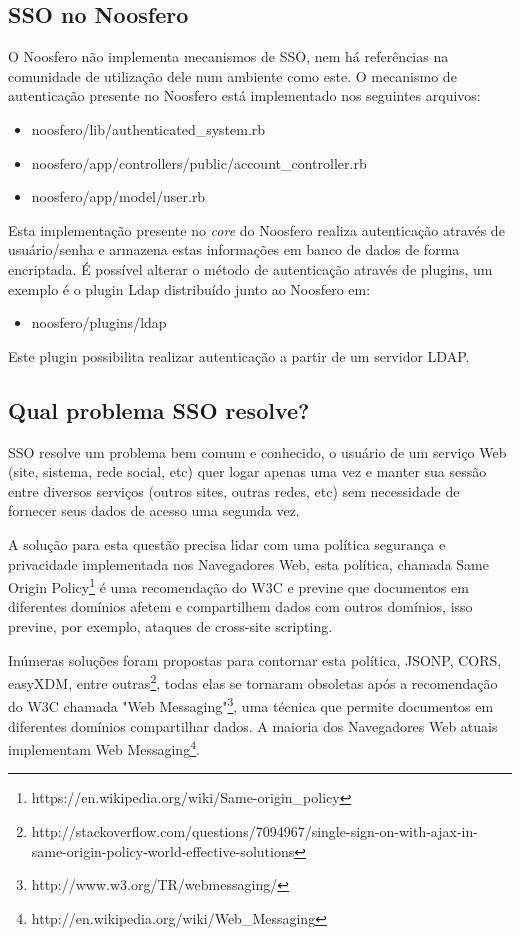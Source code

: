 \documentclass[11pt]{article}
\begin{document}
\subsection{SSO no Noosfero}

O Noosfero não implementa mecanismos de SSO, nem há referências na comunidade
de utilização dele num ambiente como este. O mecanismo de autenticação presente
no Noosfero está implementado nos seguintes arquivos:

\begin{itemize}
  \item noosfero/lib/authenticated\_system.rb
  \item noosfero/app/controllers/public/account\_controller.rb
  \item noosfero/app/model/user.rb
\end{itemize}

Esta implementação presente no {\it core} do Noosfero realiza autenticação
através de usuário/senha e armazena estas informações em banco de dados de
forma encriptada. É possível alterar o método de autenticação através de
plugins, um exemplo é o plugin Ldap distribuído junto ao Noosfero em:

\begin{itemize}
  \item noosfero/plugins/ldap
\end{itemize}

Este plugin possibilita realizar autenticação a partir de um servidor LDAP.

\subsection{Qual problema SSO resolve?}

SSO resolve um problema bem comum e conhecido, o usuário de um serviço Web
(site, sistema, rede social, etc) quer logar apenas uma vez e manter sua
sessão entre diversos serviços (outros sites, outras redes, etc) sem
necessidade de fornecer seus dados de acesso uma segunda vez.

A solução para esta questão precisa lidar com uma política segurança e
privacidade implementada nos Navegadores Web, esta política, chamada Same
Origin Policy\footnote{https://en.wikipedia.org/wiki/Same-origin\_policy} é
uma recomendação do W3C e previne que documentos em diferentes domínios afetem
e compartilhem dados com outros domínios, isso previne, por exemplo, ataques de
cross-site scripting.

Inúmeras soluções foram propostas para contornar esta política, JSONP, CORS,
easyXDM, entre
outras\footnote{http://stackoverflow.com/questions/7094967/single-sign-on-with-ajax-in-same-origin-policy-world-effective-solutions}, todas elas se tornaram obsoletas após a recomendação do
W3C chamada "Web Messaging"\footnote{http://www.w3.org/TR/webmessaging/}, uma
técnica que permite documentos em diferentes domínios compartilhar dados. A
maioria dos Navegadores Web atuais implementam Web
Messaging\footnote{http://en.wikipedia.org/wiki/Web\_Messaging}.
\end{document}
